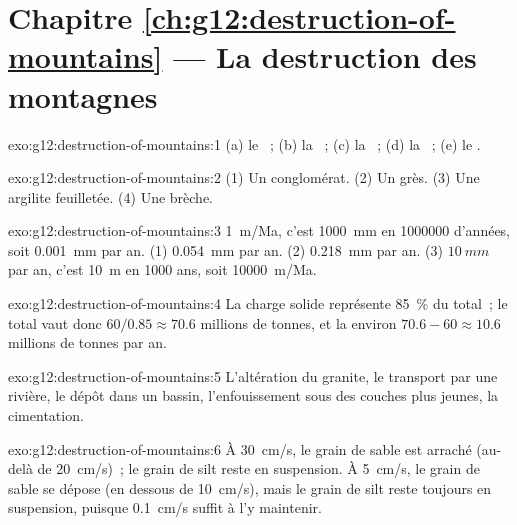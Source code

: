 \section*{Chapitre \ref{ch:g12:destruction-of-mountains} --- La destruction des montagnes}

\begin{solution}{exo:g12:destruction-of-mountains:1}
(a) le ~; (b) la ~; (c) la ~; (d) la ~; (e) le .
\end{solution}

\begin{solution}{exo:g12:destruction-of-mountains:2}
(1) Un conglomérat. (2) Un grès. (3) Une argilite feuilletée. (4) Une
brèche.
\end{solution}

\begin{solution}{exo:g12:destruction-of-mountains:3}
\qty{1}{m/Ma}, c'est \qty{1000}{mm} en \num{1000000} d'années, soit
\qty{0.001}{mm} par an. (1) \qty{0.054}{mm} par an. (2) \qty{0.218}{mm}
par an. (3) $\qty{10}{mm}$ par an, c'est \qty{10}{m} en 1000 ans, soit
\qty{10000}{m/Ma}.
\end{solution}

\begin{solution}{exo:g12:destruction-of-mountains:4}
La charge solide représente \qty{85}{\percent} du total~; le total vaut donc $60/0.85
\approx 70.6$ millions de tonnes, et la  environ $70.6 - 60 \approx
10.6$ millions de tonnes par an.
\end{solution}

\begin{solution}{exo:g12:destruction-of-mountains:5}
L'altération du granite, le transport par une rivière, le dépôt dans un
bassin, l'enfouissement sous des couches plus jeunes, la cimentation.
\end{solution}

\begin{solution}{exo:g12:destruction-of-mountains:6}
À \qty{30}{cm/s}, le grain de sable est arraché (au-delà de
\qty{20}{cm/s})~; le grain de silt reste en suspension. À \qty{5}{cm/s},
le grain de sable se dépose (en dessous de \qty{10}{cm/s}), mais le grain
de silt reste toujours en suspension, puisque \qty{0.1}{cm/s} suffit à
l'y maintenir.
\end{solution}

